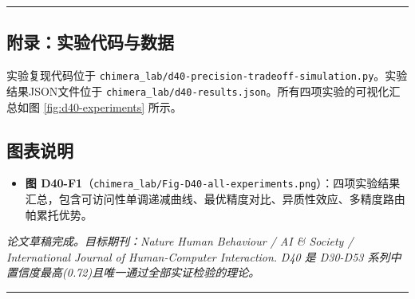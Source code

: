 \documentclass[UTF8, fontset=fandol]{ctexart}
\providecommand{\tightlist}{%
  \setlength{\itemsep}{0pt}\setlength{\parskip}{0pt}}
\begin{document}
\begin{center}\rule{0.5\linewidth}{0.5pt}\end{center}

\subsection{附录：实验代码与数据}\label{ux9644ux5f55ux5b9eux9a8cux4ee3ux7801ux4e0eux6570ux636e}

实验复现代码位于
\texttt{chimera\_lab/d40-precision-tradeoff-simulation.py}。实验结果JSON文件位于
\texttt{chimera\_lab/d40-results.json}。所有四项实验的可视化汇总如图
\ref{fig:d40-experiments} 所示。

\subsection{图表说明}\label{ux56feux8868ux8bf4ux660e}

\begin{itemize}
\tightlist
\item
  \textbf{图
  D40-F1}（\texttt{chimera\_lab/Fig-D40-all-experiments.png}）：四项实验结果汇总，包含可访问性单调递减曲线、最优精度对比、异质性效应、多精度路由帕累托优势。
\end{itemize}

\emph{论文草稿完成。目标期刊：Nature Human Behaviour / AI \& Society /
International Journal of Human-Computer Interaction.} \emph{D40 是
D30-D53 系列中置信度最高(0.72)且唯一通过全部实证检验的理论。}

\begin{center}\rule{0.5\linewidth}{0.5pt}\end{center}
\end{document}
